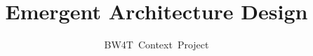 \documentclass[oneside]{tudelft-report}
\begin{document}
\frontmatter

\title[Blocks World for Teams]{Emergent Architecture \newline Design}
\author{BW4T~Context~Project}
\makecover



\mainmatter
\setcounter{tocdepth}{1}
\tableofcontents





\printglossary

%

%
\end{document}
